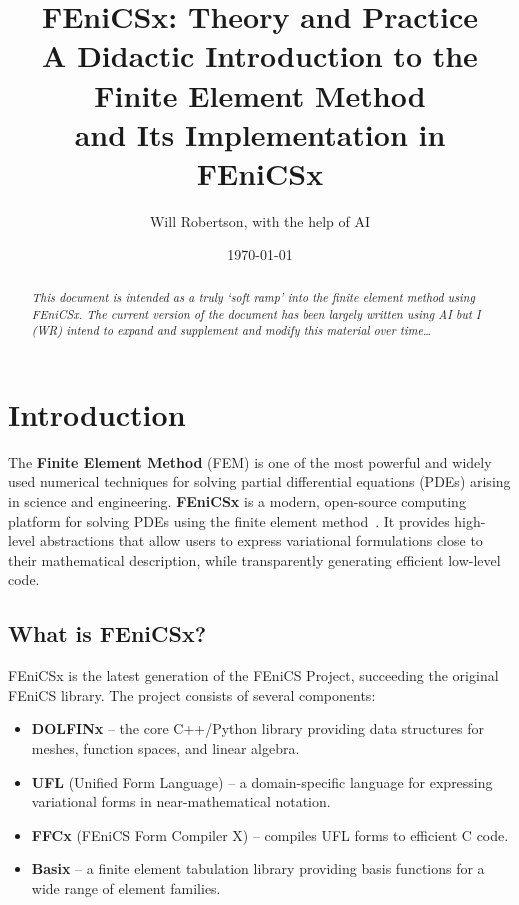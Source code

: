 \documentclass[11pt]{article}
\title{%
  \textbf{FEniCSx: Theory and Practice}\\[0.4em]
  \large A Didactic Introduction to the Finite Element Method\\
  and Its Implementation in FEniCSx
}
\author{Will Robertson, with the help of AI}
\date{\today}
\begin{document}
\maketitle
\begin{abstract}
\em
This document is intended as a truly `soft ramp' into the finite element method
using FEniCSx.
The current version of the document has been largely written using AI but I (WR)
intend to expand and supplement and modify this material over time\dots
\end{abstract}
\tableofcontents
\newpage

\section{Introduction}
\label{sec:introduction}

The \textbf{Finite Element Method} (FEM) is one of the most powerful and
widely used numerical techniques for solving partial differential equations
(PDEs) arising in science and engineering.
\textbf{FEniCSx} is a modern, open-source computing platform for solving PDEs
using the finite element method~\cite{LoggMardalWells2012, Scroggs2022}.
It provides high-level abstractions that allow users to express variational
formulations close to their mathematical description, while transparently
generating efficient low-level code.

\subsection{What is FEniCSx?}

FEniCSx is the latest generation of the FEniCS Project, succeeding the
original FEniCS library.
The project consists of several components:
\begin{itemize}
  \item \textbf{DOLFINx} -- the core C++/Python library providing data
    structures for meshes, function spaces, and linear algebra.
  \item \textbf{UFL} (Unified Form Language) -- a domain-specific language
    for expressing variational forms in near-mathematical notation.
  \item \textbf{FFCx} (FEniCS Form Compiler X) -- compiles UFL forms to
    efficient C code.
  \item \textbf{Basix} -- a finite element tabulation library providing
    basis functions for a wide range of element families.
\end{itemize}
\end{document}
